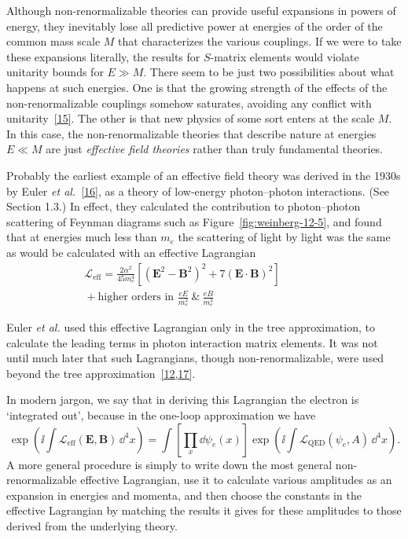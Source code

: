 

Although non-renormalizable theories can provide useful expansions in powers
of energy, they inevitably lose all predictive power at energies of the order
of the common mass scale $M$ that characterizes the various couplings. If we
were to take these expansions literally, the results for $S$-matrix elements
would violate unitarity bounds for $E\gg M$. There seem to be just two
possibilities about what happens at such energies. One is that the growing
strength of the effects of the non-renormalizable couplings somehow saturates,
avoiding any conflict with unitarity~\hyperref[ref:12.15]{[15]}. The other is
that new physics of some sort enters at the scale $M$. In this case, the
non-renormalizable theories that describe nature at energies $E\ll M$ are just
\emph{effective field theories} rather than truly fundamental theories.

Probably the earliest example of an effective field theory was derived in the
1930s by Euler \emph{et al.}~\hyperref[ref:12.16]{[16]}, as a theory of
low-energy photon--photon interactions. (See Section 1.3.) In effect, they
calculated the contribution to photon--photon scattering of Feynman diagrams
such as Figure~\ref{fig:weinberg-12-5}, and found that at energies much less
than $m_e$ the scattering of light by light was the same as would be
calculated with an effective Lagrangian
\[
\begin{split}
\mathcal L_{\mathrm{eff}}=\frac{2\alpha^2}{45m_e^4}
\left[(\mathbf E^2-\mathbf B^2)^2+7(\mathbf E\cdot\mathbf B)^2\right]
\qquad\qquad\\
{}+\text{higher orders in }\frac{eE}{m_e^2}\ \&\ \frac{eB}{m_e^2}
\end{split}
\]



Euler \emph{et al.} used this effective Lagrangian only in the tree
approximation, to calculate the leading terms in photon interaction matrix
elements. It was not until much later that such Lagrangians, though
non-renormalizable, were used beyond the tree
approximation~\hyperref[ref:12.12]{[12,}\hyperref[ref:12.17]{17]}.

In modern jargon, we say that in deriving this Lagrangian the electron is
`integrated out', because in the one-loop approximation we have
\[
\exp\left(\ii\int\mathcal L_{\mathrm{eff}}(\mathbf E,\mathbf B)\,\dd^4x\right)
=\int\left[\prod_x \dd\psi_e(x)\right]
\exp\left(\ii\int\mathcal L_{\mathrm{QED}}(\psi_e,A)\,\dd^4x\right).
\]
A more general procedure is simply to write down the most general
non-renormalizable effective Lagrangian, use it to calculate various
amplitudes as an expansion in energies and momenta, and then choose the
constants in the effective Lagrangian by matching the results it gives for
these amplitudes to those derived from the underlying theory.

